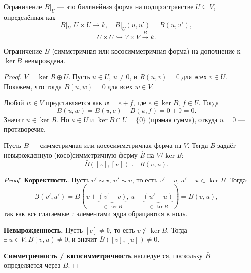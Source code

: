 


\begin{definition}
    Ограничение $B|_U$ --- это билинейная форма на подпространстве $U \subseteq V$, определённая как
    \[
        B|_U \colon U \times U \to k, \quad B|_U(u, u') = B(u, u'),
    \]
    \[
        U \times U \hookrightarrow V \times V \xrightarrow{B} k.
    \]
\end{definition}


\begin{stmt}
    Ограничение $B$ (симметричная или кососимметричная форма) на дополнение к $\ker B$ невырождена.

    \begin{proof}
        $V = \ker B \oplus U$.
        Пусть $u \in U$, $u \neq 0$, и $B(u, v) = 0$ для всех $v \in U$. Покажем, что тогда $B(u, w) = 0$ для всех
        $w \in V$.

        Любой $w \in V$ представляется как $w = e + f$, где $e \in \ker B$, $f \in U$. Тогда
        \[
            B(u, w) = B(u, e) + B(u, f) = 0 + 0 = 0.
        \]
        Значит $u \in \ker B$. Но $u \in U$ и $\ker B \cap U = \{0\}$ (прямая сумма), откуда $u = 0$ --- противоречие.
    \end{proof}
\end{stmt}


\begin{stmt}
    Пусть $B$ --- симметричная или кососимметричная форма на $V$.
    Тогда $B$ задаёт невырожденную (косо)симметричную форму $\bar{B}$ на $V / \ker B$:
    \[
        \bar{B}([v], [u]) \coloneqq B(v, u).
    \]

    \begin{proof}
        \textbf{Корректность.} Пусть $v' \sim v$, $u' \sim u$, то есть $v' - v, \, u' - u \in \ker B$. Тогда:
        \[
            B(v', u') = B(v + \underbrace{(v' - v)}_{\in\, \ker B},\, u + \underbrace{(u' - u)}_{\in\,
            \ker B}) = B(v, u),
        \]
        так как все слагаемые с элементами ядра обращаются в ноль.

        \textbf{Невырожденность.} Пусть $[v] \neq 0$, то есть $v \notin \ker B$.
        Тогда $\exists\, u \in V\colon B(v, u) \neq 0$, и значит $\bar{B}([v], [u]) \neq 0$.

        \textbf{Симметричность / кососимметричность} наследуется, поскольку $\bar{B}$ определяется через $B$.
    \end{proof}
\end{stmt}


